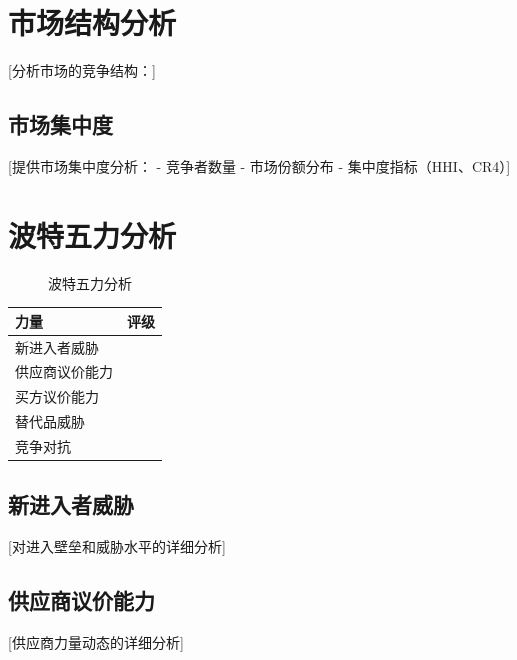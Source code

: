 \documentclass[11pt,letterpaper]{report}
\begin{document}
{\section{市场结构分析}

[分析市场的竞争结构：]

\subsection{市场集中度}

[提供市场集中度分析：
- 竞争者数量
- 市场份额分布
- 集中度指标（HHI、CR4）]

\section{波特五力分析}


\begin{figure}[htbp]
\centering
\caption{波特五力分析}
\label{fig:porter}
\end{figure}

\begin{porterbox}[波特五力总结]
\begin{tabular}{@{}ll@{}}
\textbf{力量} & \textbf{评级} \\
\midrule
新进入者威胁 & \riskmedium{} \\
供应商议价能力 & \risklow{} \\
买方议价能力 & \riskhigh{} \\
替代品威胁 & \risklow{} \\
竞争对抗 & \riskhigh{} \\
\end{tabular}
\end{porterbox}

\subsection{新进入者威胁}
[对进入壁垒和威胁水平的详细分析]

\subsection{供应商议价能力}
[供应商力量动态的详细分析]

}
\end{document}
